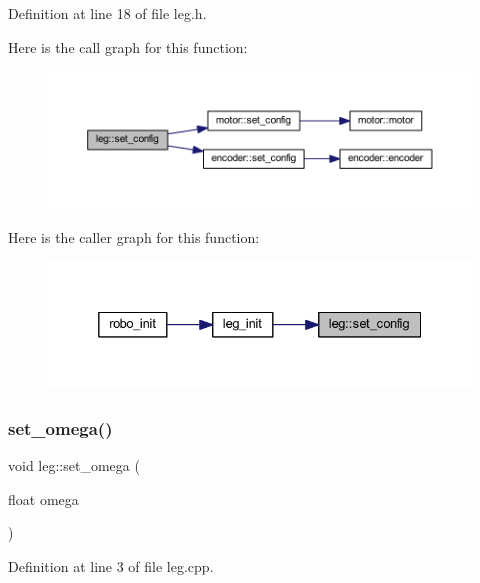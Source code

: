 Definition at line 18 of file leg.\+h.

Here is the call graph for this function\+:
\nopagebreak
\begin{figure}[H]
\begin{center}
\leavevmode
\includegraphics[width=350pt]{classleg_aee2ceb15630cf35d5bc69959da270e51_cgraph}
\end{center}
\end{figure}
Here is the caller graph for this function\+:
\nopagebreak
\begin{figure}[H]
\begin{center}
\leavevmode
\includegraphics[width=332pt]{classleg_aee2ceb15630cf35d5bc69959da270e51_icgraph}
\end{center}
\end{figure}
\mbox{\label{classleg_a0b0845622d8b17f34739b390846bf957}} 
\subsubsection{\texorpdfstring{set\_omega()}{set\_omega()}}
{\footnotesize\ttfamily void leg\+::set\+\_\+omega (\begin{DoxyParamCaption}\item[{float}]{omega }\end{DoxyParamCaption})}



Definition at line 3 of file leg.\+cpp.

